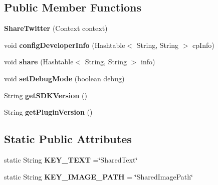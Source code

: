 \subsection*{Public Member Functions}
\begin{DoxyCompactItemize}
\item 
\mbox{\label{classorg_1_1cocos2dx_1_1plugin_1_1ShareTwitter_a97c28f13588853301573fbc28d25e5f3}} 
{\bfseries Share\+Twitter} (Context context)
\item 
\mbox{\label{classorg_1_1cocos2dx_1_1plugin_1_1ShareTwitter_ae735dd67c3849702089f9a753f697ed4}} 
void {\bfseries config\+Developer\+Info} (Hashtable$<$ String, String $>$ cp\+Info)
\item 
\mbox{\label{classorg_1_1cocos2dx_1_1plugin_1_1ShareTwitter_a30c9ed6e3815e41952961c9fc4eace6d}} 
void {\bfseries share} (Hashtable$<$ String, String $>$ info)
\item 
\mbox{\label{classorg_1_1cocos2dx_1_1plugin_1_1ShareTwitter_a745121e0d2c37b72a7007c1d4c664855}} 
void {\bfseries set\+Debug\+Mode} (boolean debug)
\item 
\mbox{\label{classorg_1_1cocos2dx_1_1plugin_1_1ShareTwitter_a4eda22399c49997a229af42cd3a53ffc}} 
String {\bfseries get\+S\+D\+K\+Version} ()
\item 
\mbox{\label{classorg_1_1cocos2dx_1_1plugin_1_1ShareTwitter_a218f38b7bc5cce2ba584f245d6fbf8b0}} 
String {\bfseries get\+Plugin\+Version} ()
\end{DoxyCompactItemize}
\subsection*{Static Public Attributes}
\begin{DoxyCompactItemize}
\item 
\mbox{\label{classorg_1_1cocos2dx_1_1plugin_1_1ShareTwitter_ae6703dc656875a3d6a616aa1ee686253}} 
static String {\bfseries K\+E\+Y\+\_\+\+T\+E\+XT} =\char`\"{}Shared\+Text\char`\"{}
\item 
\mbox{\label{classorg_1_1cocos2dx_1_1plugin_1_1ShareTwitter_a41a73aa5e6b5e35e9dd26491c3a99a70}} 
static String {\bfseries K\+E\+Y\+\_\+\+I\+M\+A\+G\+E\+\_\+\+P\+A\+TH} = \char`\"{}Shared\+Image\+Path\char`\"{}
\end{DoxyCompactItemize}
